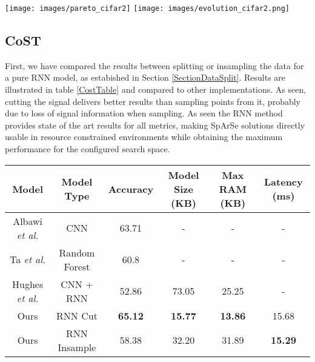 \documentclass[a4paper, twocolumn]{article}
\begin{document}
\begin{figure*}[bp]
	\centering
	\texttt{[image: images/pareto\_cifar2]}
	\texttt{[image: images/evolution\_cifar2.png]}
	\caption{Left: Pareto frontier for our implementation of Sparse and Cifar 10 Binary. Notice the different possibilities to choose among regarding RAM, size and performance. Each point corresponds to a specific configuration of the search space. Right: full search procedure for CIFAR-10 Binary with the modified SpArSe. The color degradation shows the progress of the search.}
	\label{fig:paretocifar2}
\end{figure*}



\subsection{CoST}
First, we have compared the results between splitting or insampling the data for a pure RNN model, as estabished in Section \ref{SectionDataSplit}. Results are illustrated in table \ref{CostTable} and compared to other implementations. As seen, cutting the signal delivers better results than sampling points from it, probably due to loss of signal information when sampling. As seen the RNN method provides state of the art results for all metrics, making SpArSe solutions directly usable in resource constrained environments while obtaining the maximum performance for the configured search space. 

\begin{table*}
\center
\begin{tabular}{|c|c|c|c|c|c|}
	\hline
	Model	& Model Type & Accuracy & Model Size (KB) & Max RAM (KB) & Latency (ms) \\
	\hline
	Albawi \textit{et al.} \cite{Albawi2018}  & CNN & 63.71  & -  & -  & - \\
	\hline
	Ta \textit{et al.} \cite{Ta2015a} & Random Forest & 60.8  & -  & - & -  \\
	\hline
	Hughes \textit{et al.} \cite{Hughes2017} & CNN + RNN & 52.86 &  73.05 & 25.25 & -  \\
	\hline
	Ours & RNN Cut & \textbf{65.12} & \textbf{15.77} & \textbf{13.86} & 15.68 \\
	\hline
	Ours & RNN Insample & 58.38 & 32.20 & 31.89 & \textbf{15.29} \\
	\hline
\end{tabular}
\caption{Results for the CoST dataset with hold one subject out cross validation, as in \cite{Albawi2018} and \cite{Jung2015}.}\label{CostTable}
\end{table*}
\end{document}
